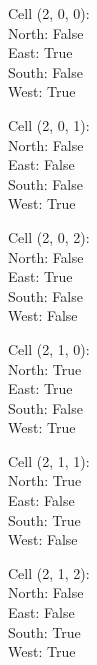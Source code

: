 \documentclass{article}
\begin{document}
\begin{multicols*}{3}
Cell (2, 0, 0):\\
\-\hspace{2cm}North: False\\
\-\hspace{2cm}East: True\\
\-\hspace{2cm}South: False\\
\-\hspace{2cm}West: True

Cell (2, 0, 1):\\
\-\hspace{2cm}North: False\\
\-\hspace{2cm}East: False\\
\-\hspace{2cm}South: False\\
\-\hspace{2cm}West: True

Cell (2, 0, 2):\\
\-\hspace{2cm}North: False\\
\-\hspace{2cm}East: True\\
\-\hspace{2cm}South: False\\
\-\hspace{2cm}West: False

Cell (2, 1, 0):\\
\-\hspace{2cm}North: True\\
\-\hspace{2cm}East: True\\
\-\hspace{2cm}South: False\\
\-\hspace{2cm}West: True

Cell (2, 1, 1):\\
\-\hspace{2cm}North: True\\
\-\hspace{2cm}East: False\\
\-\hspace{2cm}South: True\\
\-\hspace{2cm}West: False

Cell (2, 1, 2):\\
\-\hspace{2cm}North: False\\
\-\hspace{2cm}East: False\\
\-\hspace{2cm}South: True\\
\-\hspace{2cm}West: True


\end{multicols*}
\end{document}
